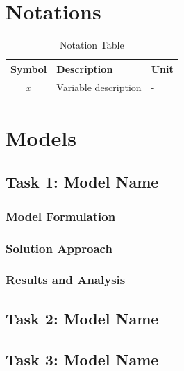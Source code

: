 \documentclass[12pt]{article}
\begin{document}
\section{Notations}

\begin{table}[H]
\centering
\caption{Notation Table}
\begin{tabular}{cll}
\toprule
\textbf{Symbol} & \textbf{Description} & \textbf{Unit} \\
\midrule
$x$ & Variable description & - \\
\bottomrule
\end{tabular}
\end{table}

\section{Models}

\subsection{Task 1: Model Name}
\subsubsection{Model Formulation}

\subsubsection{Solution Approach}

\subsubsection{Results and Analysis}

\subsection{Task 2: Model Name}

\subsection{Task 3: Model Name}
\end{document}
